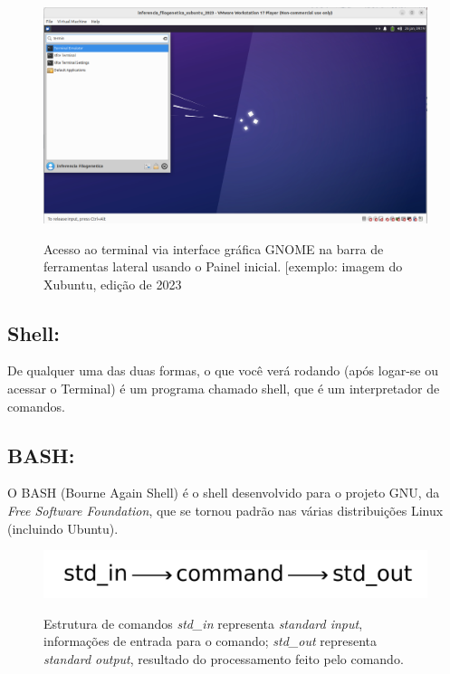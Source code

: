 \begin{refsection}
  \begin{figure}[H]
      {\includegraphics[scale=0.35]{figures/tut1/terminal2.jpg}}
      {\caption[\textit{Acesso ao terminal via interface gráfica GNOME usando o Painel inicial}]{Acesso ao terminal via interface gráfica GNOME na barra de ferramentas lateral  usando o Painel inicial. [exemplo: imagem do Xubuntu, edição de 2023}\label{tut1:fig:terminal2}}
  \end{figure}


\subsection{Shell:}\label{tut1:text_mode:commands:shell}
 De qualquer uma das duas formas, o que você verá rodando (após logar-se ou acessar o Terminal) é um programa chamado shell, que é um interpretador de comandos.\\
 \subsection{BASH:}\label{tut1:text_mode:commands:bash}
O BASH (Bourne Again Shell) é o shell desenvolvido para o projeto GNU, da \textit{Free Software Foundation}, que se tornou padrão nas várias distribuições Linux (incluindo Ubuntu).\\

  \begin{figure}[H]
      {\includegraphics[scale=0.8]{figures/tut1/command_line.pdf}}
      {\caption[\textit{Estrutura de comandos}]{Estrutura de comandos\: \textit{std\_in} representa \textit{standard input}, informações de entrada para o comando;  \textit{std\_out} representa \textit{standard output}, resultado do processamento feito pelo comando.}\label{tut1:fig:commands}}


\end{figure}
\end{refsection}
